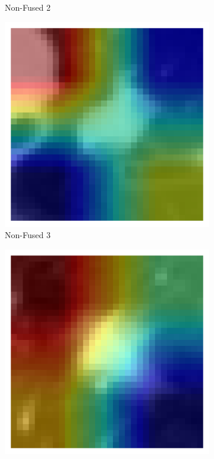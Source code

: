 \begin{figure}[htbp]
\begin{subfigure}[b]{0.18\textwidth}
        \caption*{Non-Fused 2}
    \end{subfigure}
    \begin{subfigure}[b]{0.18\textwidth}
        \centering
        \includegraphics[width=\linewidth]{figures/heatmaps/ex3/sample_gradcam_non_fused.png}
        \caption*{Non-Fused 3}
    \end{subfigure}
    \begin{subfigure}[b]{0.18\textwidth}
        \centering
        \includegraphics[width=\linewidth]{figures/heatmaps/ex4/sample_gradcam_non_fused.png}

\end{subfigure}
\end{figure}
